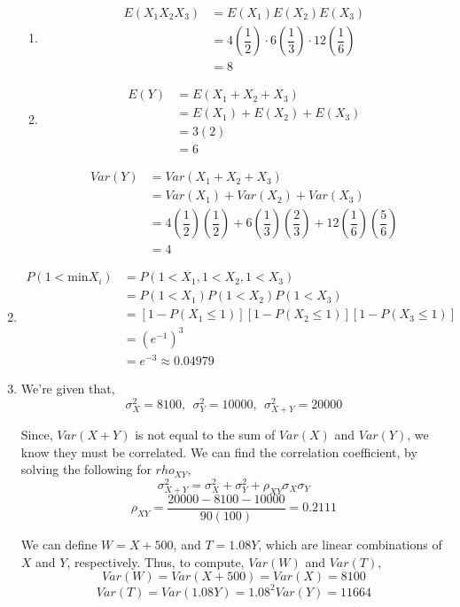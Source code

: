 \documentclass{article}
\newcommand\mfrac[2]{\left(\dfrac{#1}{#2}\right)}
\newcommand\myskip[1]{\addtocounter{enumi}{#1}}
\begin{document}
\begin{enumerate}
\begin{enumerate}
       \item
	\begin{align*}
	  E(X_1 X_2 X_3) &= E(X_1)E(X_2)E(X_3) \\
	    &= 4\mfrac{1}{2} \cdot 6\mfrac{1}{3} \cdot 12\mfrac{1}{6} \\
	    &= 8
	\end{align*}
       \item
	\begin{align*}
	  E(Y) &= E(X_1 + X_2 + X_3) \\
	    &= E(X_1) + E(X_2) + E(X_3) \\
	    &= 3(2) \\
	    &= 6
	\end{align*}
	
	\begin{align*}
	  Var(Y) &= Var(X_1 + X_2 + X_3) \\
	    &= Var(X_1) + Var(X_2) + Var(X_3) \\
	    &= 4\mfrac{1}{2}\mfrac{1}{2} + 6\mfrac{1}{3}\mfrac{2}{3} + 12\mfrac{1}{6}\mfrac{5}{6} \\
	    &= 4
	\end{align*}
      \end{enumerate}
     
     \item
      
      \begin{align*}
       P(1 < \text{min}X_i) &= P(1 < X_1, 1 < X_2, 1 < X_3) \\
	&= P(1 < X_1)P(1 < X_2)P(1 < X_3) \\
	&= [1 - P(X_1 \le 1)][1 - P(X_2 \le 1)][1 - P(X_3 \le 1)] \\
	&= (e^{-1})^3 \\
	&= e^{-3} \approx 0.04979
      \end{align*}
     \myskip{4}
     
     \item
      We're given that,
      $$\sigma_X^2 = 8100,\ \ \sigma_Y^2 = 10000,\ \ \sigma_{X+Y}^2 = 20000$$
      
      Since, $Var(X+Y)$ is not equal to the sum of $Var(X)$ and $Var(Y)$, we know they must be 
      correlated. We can find the correlation coefficient, by solving the following for $rho_{XY}$,
      $$\sigma_{X+Y}^2 = \sigma_X^2 + \sigma_Y^2 + \rho_{XY} \sigma_X \sigma_Y$$
      $$\rho_{XY} = \dfrac{20000-8100-10000}{90(100)} = 0.2111$$
      
      We can define $W = X+500$, and $T = 1.08Y$, which are linear combinations of $X$ and $Y$, respectively.
      Thus, to compute, $Var(W)$ and $Var(T)$,
      $$Var(W) = Var(X+500) = Var(X) = 8100$$
      $$Var(T) = Var(1.08Y) = 1.08^2 Var(Y) = 11664$$
      

\end{enumerate}
\end{document}
